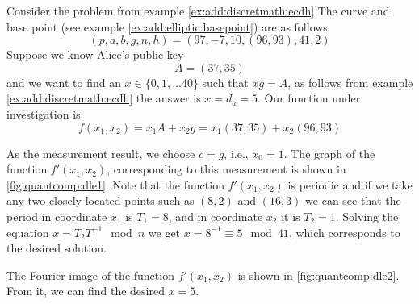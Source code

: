 \begin{example}
Consider the problem from example \ref{ex:add:discretmath:ecdh}
The curve and base point (see example \ref{ex:add:elliptic:basepoint})
are as follows
\[
(p,a,b,g,n,h) = (97, -7, 10, (96,93), 41, 2)
\]
Suppose we know Alice's public key
\[
A = (37, 35)
\]
and we want to find an $x \in \{0,1, \dots 40\}$ such that
$x g = A$, as follows from example \ref{ex:add:discretmath:ecdh}
the answer is $x = d_a  = 5$.
Our function under investigation is
\[
f\left(x_1,x_2\right) = x_1 A + x_2 g = x_1 (37,35) + x_2 (96,93)
\]



As the measurement result, we choose $c = g$, i.e., $x_0 = 1$.
The graph of the function $f'(x_1, x_2)$, corresponding to this measurement
is shown in \autoref{fig:quantcomp:dle1}. Note that
the function $f'(x_1, x_2)$ is periodic and if we take any two closely
located points such as $(8,2)$ and $(16,3)$ we can see that
the period in coordinate $x_1$ is $T_1=8$, and in coordinate $x_2$ it is $T_2
= 1$. Solving the equation $x = T_2 T_1^{-1} \mod n$ we get $x = 8^{-1}
 \equiv 5 \mod 41$, which corresponds to the desired solution.



The Fourier image of the function $f'(x_1, x_2)$ is shown in
\autoref{fig:quantcomp:dle2}. From it, we can find the desired $x =
5$. 

\end{example}
